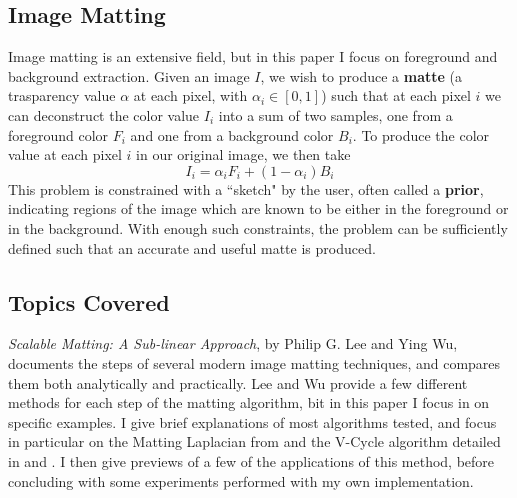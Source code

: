 \subsection{Image Matting}
Image matting is an extensive field, but in this paper I focus on foreground and background extraction. Given an image $I$, we wish to produce a \textbf{matte} (a trasparency value $\alpha$ at each pixel, with $\alpha_{i}\in[0,1]$) such that at each pixel $i$ we can deconstruct the color value $I_{i}$ into a sum of two samples, one from a foreground color $F_{i}$ and one from a background color $B_{i}$. To produce the color value at each pixel $i$ in our original image, we then take
\[I_{i}=\alpha_{i}F_{i}+(1-\alpha_{i})B_{i}\]
This problem is constrained with a ``sketch" by the user, often called a \textbf{prior}, indicating regions of the image which are known to be either in the foreground or in the background. With enough such constraints, the problem can be sufficiently defined such that an accurate and useful matte is produced.
\subsection{Topics Covered}
\textit{Scalable Matting: A Sub-linear Approach}, by Philip G. Lee and Ying Wu, documents the steps of several modern image matting techniques, and compares them both analytically and practically. Lee and Wu provide a few different methods for each step of the matting algorithm, bit in this paper I focus in on specific examples. I give brief explanations of most algorithms tested, and focus in particular on the Matting Laplacian from \cite{levin08} and the V-Cycle algorithm detailed in \cite{briggs87} and \cite{bramble93}. I then give previews of a few of the applications of this method, before concluding with some experiments performed with my own implementation.
